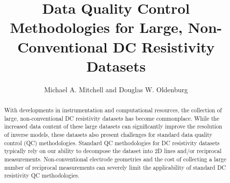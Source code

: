 \documentclass[final,authoryear,5p,times,twocolumn]{elsarticle}
\begin{document}
\begin{frontmatter}



\title{Data Quality Control Methodologies for Large, Non-Conventional DC Resistivity Datasets}


\author{Michael A. Mitchell and Douglas W. Oldenburg}

\address{Geophysical Inversion Facility (GIF), \\
Department of Earth, Ocean and Atmospheric Sciences, \\
University of British Columbia, \\
2020-2207 Main Mall, \\
Vancouver, British Columbia \\
Canada, V6T 1Z4}

\begin{abstract}
With developments in instrumentation and computational resources, the collection of large, non-conventional DC resistivity datasets has become commonplace. While the increased data content of these large datasets can significantly improve the resolution of inverse models, these datasets also present challenges for standard data quality control (QC) methodologies. Standard QC methodologies for DC resistivity datasets typically rely on our ability to decompose the dataset into 2D lines and/or reciprocal measurements. Non-conventional electrode geometries and the cost of collecting a large number of reciprocal measurements can severely limit the applicability of standard DC resistivity QC methodologies.


\end{abstract}
\end{frontmatter}
\end{document}
